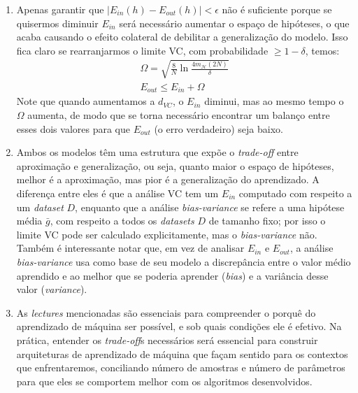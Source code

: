 \documentclass[a4paper,11pt]{article}
\begin{document}
\begin{enumerate}
        \item Apenas garantir que $|E_{in} (h) - E_{out} (h)| < \epsilon$ não é suficiente porque se quisermos diminuir $E_{in}$ será necessário aumentar o espaço de hipóteses, o que acaba causando o efeito colateral de debilitar a generalização do modelo. Isso fica claro se rearranjarmos o limite VC, com probabilidade  $\geq 1 - \delta$, temos:
        \[
            \begin{array}{ll}
            \Omega = \sqrt{\frac{8}{N} \ln \frac{4 m_{\mathcal{H}}(2N)}{\delta}} \\
            E_{out} \leq E_{in} + \Omega
            \end{array}
        \]
        Note que quando aumentamos a $d_{VC}$, o $E_{in}$ diminui, mas ao mesmo tempo o $\Omega$ aumenta, de modo que se torna necessário encontrar um balanço entre esses dois valores para que $E_{out}$ (o erro verdadeiro) seja baixo.
        
        \item Ambos os modelos têm uma estrutura que expõe o \textit{trade-off} entre aproximação e generalização, ou seja, quanto maior o espaço de hipóteses, melhor é a aproximação, mas pior é a generalização do aprendizado. A diferença entre eles é que a análise VC tem um $E_{in}$ computado com respeito a um \textit{dataset} $D$, enquanto que a análise \textit{bias-variance} se refere a uma hipótese média $\bar{g}$, com respeito a todos os \textit{datasets} $D$ de tamanho fixo; por isso o limite VC pode ser calculado explicitamente, mas o \textit{bias-variance} não. Também é interessante notar que, em vez de analisar $E_{in}$ e $E_{out}$, a análise \textit{bias-variance} usa como base de seu modelo a discrepância entre o valor médio aprendido e ao melhor que se poderia aprender (\textit{bias}) e a variância desse valor (\textit{variance}).
        
        \item As \textit{lectures} mencionadas são essenciais para compreender o porquê do aprendizado de máquina ser possível, e sob quais condições ele é efetivo. Na prática, entender os \textit{trade-off}s necessários será essencial para construir arquiteturas de aprendizado de máquina que façam sentido para os contextos que enfrentaremos, conciliando número de amostras e número de parâmetros para que eles se comportem melhor com os algoritmos desenvolvidos.
        
    \end{enumerate}
\end{document}
